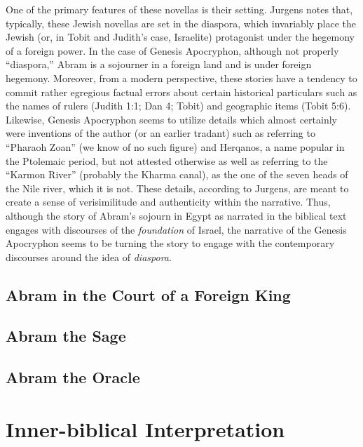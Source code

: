 One of the primary features of these novellas is their setting. Jurgens
notes that, typically, these Jewish novellas are set in the diaspora,
which invariably place the Jewish (or, in Tobit and Judith's case,
Israelite) protagonist under the hegemony of a foreign power. In the
case of Genesis Apocryphon, although not properly ``diaspora,'' Abram is
a sojourner in a foreign land and is under foreign hegemony. Moreover,
from a modern perspective, these stories have a tendency to commit
rather egregious factual errors about certain historical particulars
such as the names of rulers (Judith 1:1; Dan 4; Tobit) and geographic
items (Tobit 5:6). Likewise, Genesis Apocryphon seems to utilize details
which almost certainly were inventions of the author (or an earlier
tradant) such as referring to ``Pharaoh Zoan'' (we know of no such
figure) and Herqanos, a name popular in the Ptolemaic period, but not
attested otherwise as well as referring to the ``Karmon River''
(probably the Kharma canal), as the one of the seven heads of the Nile
river, which it is not.\autocites[7]{jurgens_jsj2018}[See
also][50--59]{machiela_as2010}[197--199]{fitzmyer2004} These details,
according to Jurgens, are meant to create a sense of verisimilitude and
authenticity within the narrative. Thus, although the story of Abram's
sojourn in Egypt as narrated in the biblical text engages with
discourses of the \emph{foundation} of Israel, the narrative of the
Genesis Apocryphon seems to be turning the story to engage with the
contemporary discourses around the idea of \emph{diaspora}.

\hypertarget{abram-in-the-court-of-a-foreign-king}{%
\subsection{Abram in the Court of a Foreign
King}\label{abram-in-the-court-of-a-foreign-king}}

\hypertarget{abram-the-sage}{%
\subsection{Abram the Sage}\label{abram-the-sage}}

\hypertarget{abram-the-oracle}{%
\subsection{Abram the Oracle}\label{abram-the-oracle}}

\hypertarget{inner-biblical-interpretation}{%
\section{Inner-biblical
Interpretation}\label{inner-biblical-interpretation}}
